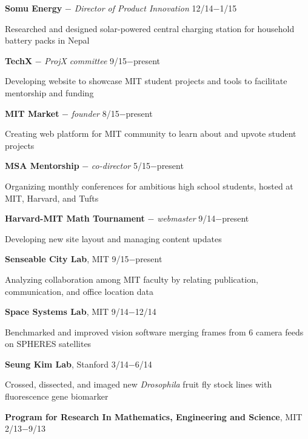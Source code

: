 \documentclass[11pt]{article}
\newcommand{\msection}[1]{\vspace{1em}\marginnote{#1}} %
\newcommand{\bt}[1]{\textbf{#1}} %
\newcommand{\gap}[0]{\vspace{0.5em}} %
\newcommand{\dash}[0]{ $-$ } %
\begin{document}

\gap

\bt{Somu Energy}\dash \emph{Director of Product Innovation} \hfill 12/14$-$1/15

Researched and designed solar-powered central charging station for household battery packs in Nepal





\msection{Leadership}
\bt{TechX}\dash \emph{ProjX committee} \hfill 9/15$-$present

Developing website to showcase MIT student projects and tools to facilitate mentorship and funding

\gap

\bt{MIT Market}\dash \emph{founder} \hfill 8/15$-$present

Creating web platform for MIT community to learn about and upvote student projects

\gap

\bt{MSA Mentorship}\dash \emph{co-director} \hfill 5/15$-$present

Organizing monthly conferences for ambitious high school students, hosted at MIT, Harvard, and Tufts

\gap

\bt{Harvard-MIT Math Tournament}\dash \emph{webmaster} \hfill 9/14$-$present

Developing new site layout and managing content updates


\msection{Research}

\bt{Senseable City Lab}, MIT \hfill 9/15$-$present

Analyzing collaboration among MIT faculty by relating publication, communication, and office location data

\gap

\bt{Space Systems Lab}, MIT \hfill 9/14$-$12/14

Benchmarked and improved vision software merging frames from 6 camera feeds on SPHERES satellites

\gap

\bt{Seung Kim Lab}, Stanford \hfill 3/14$-$6/14

Crossed, dissected, and imaged new \emph{Drosophila} fruit fly stock lines with fluorescence gene biomarker

\gap

\bt{Program for Research In Mathematics, Engineering and Science}, MIT \hfill 2/13$-$9/13
\end{document}
